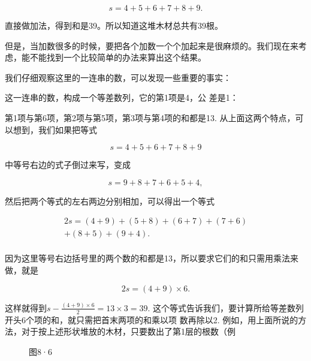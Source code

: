 \[
s = 4 + 5 + 6 + 7 + 8 + 9.
\]

直接做加法，得到和是39。所以知道这堆木材总共有39根。

但是，当加数很多的时候，要把各个加数一个个加起来是很麻烦的。我们现在来考虑，能不能找到一个比较简单的办法来算出这个结果。

我们仔细观察这里的一连串的数，可以发现一些重要的事实：

这一连串的数，构成一个等差数列，它的第1项是4，公 差是1：

第1项与第6项，第2项与第5项，第3项与第4项的和都是13.
从上面这两个特点，可以想到，我们如果把等式

\[
s = 4 + 5 + 6 + 7 + 8 + 9
\]

中等号右边的式子倒过来写，变成

\[
s = 9 + 8 + 7 + 6 + 5 + 4,
\]

然后把两个等式的左右两边分别相加，可以得出一个等式

\[
\begin{array}{l} 2 s = (4 + 9) + (5 + 8) + (6 + 7) + (7 + 6) \\ + (8 + 5) + (9 + 4). \\ \end{array}
\]

因为这里等号右边括号里的两个数的和都是13，所以要求它们的和只需用乘法来做，就是

\[
2 s = (4 + 9) \times 6.
\]

这样就得到\(s - \frac{(4 + 9)\times 6}{2} = 13\times 3 = 39.\)
这个等式告诉我们，要计算所给等差数列开头6个项的和，就只需把首末两项的和乘以项
数再除以2.
例如，用上面所说的方法，对于按上述形状堆放的木材，只要数出了第1层的根数（例

\begin{figure}
\centering
\caption{图8·6}
\end{figure}


